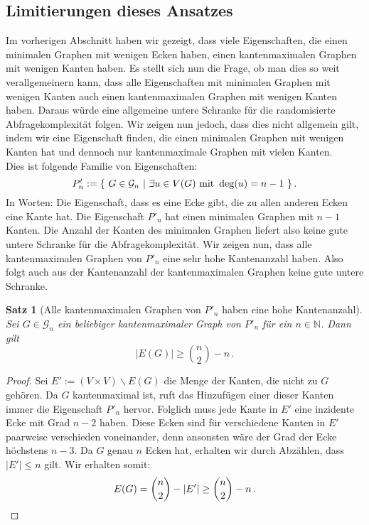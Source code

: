 \documentclass[10pt,a4paper, footheight=1mm]{scrreprt}
\newtheorem{Satz}[definition]{Satz}
\theoremstyle{definition}
\begin{document}
\subsection{Limitierungen dieses Ansatzes}
Im vorherigen Abschnitt haben wir gezeigt, dass viele Eigenschaften,
die einen  minimalen Graphen mit wenigen Ecken haben, einen kantenmaximalen
Graphen mit wenigen Kanten haben. Es stellt sich nun die Frage,
ob man dies so weit verallgemeinern kann, dass alle Eigenschaften
mit minimalen Graphen mit wenigen Kanten auch einen kantenmaximalen
Graphen mit wenigen Kanten haben. Daraus würde eine allgemeine
untere Schranke für die randomisierte Abfragekomplexität folgen.
Wir zeigen nun jedoch, dass dies nicht allgemein gilt, indem wir
eine Eigenschaft finden, die einen minimalen Graphen mit wenigen
Kanten hat und dennoch nur kantenmaximale Graphen mit vielen Kanten. \\
Dies ist folgende Familie von Eigenschaften:
$$ P'_n := \{ \ G \in \mathcal{G}_n \ 
| \ \exists u\in V(G) \textup{ mit } \deg(u) = n-1 \ \}\,.$$
In Worten: Die Eigenschaft, dass es eine Ecke gibt,
die zu allen anderen Ecken eine Kante hat.
Die Eigenschaft $P'_n$ hat einen minimalen Graphen mit
$n-1$ Kanten. Die Anzahl der Kanten des minimalen Graphen
liefert also keine gute untere Schranke für die Abfragekomplexität.
Wir zeigen nun, dass alle kantenmaximalen Graphen von $P'_n$
eine sehr hohe Kantenanzahl haben. Also folgt auch aus der Kantenanzahl
der kantenmaximalen Graphen keine gute untere Schranke.
\begin{Satz}[Alle kantenmaximalen Graphen von $P'_n$ 
             haben eine hohe Kantenanzahl]
Sei $G\in \mathcal{G}_n$ ein beliebiger kantenmaximaler Graph
von $P'_n$ für ein $n\in \mathbb{N}$. Dann gilt
$$ |E(G)| \geq \binom{n}{2} - n\,.$$
\end{Satz}
\begin{proof}
Sei $E' := (V \times V) \backslash E(G)$ die Menge der Kanten, die nicht
zu $G$ gehören. Da $G$ kantenmaximal ist, ruft das Hinzufügen
einer dieser Kanten immer die Eigenschaft $P'_n$ hervor.
Folglich muss jede Kante in $E'$ eine inzidente Ecke mit Grad
$n-2$ haben. Diese Ecken sind für verschiedene Kanten in $E'$
paarweise verschieden voneinander, denn ansonsten wäre der
Grad der Ecke höchstens $n-3$. Da $G$ genau $n$ Ecken hat,
erhalten wir durch Abzählen, dass $|E'| \leq n$ gilt.
Wir erhalten somit:
\begin{equation*}
E(G) = \binom{n}{2} - |E'| \geq \binom{n}{2} - n\,. \qedhere
\end{equation*}
\end{proof}
\end{document}

